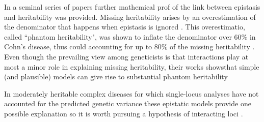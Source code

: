 In a seminal series of papers \cite{zuk2012mystery, zuk2014searching} further mathemical prof of the link between epistasis and heritability was provided.
Missing heritability arises by an overestimation of the denominator that happens when epistasis is ignored \cite{zuk2012mystery}.
This overestimatio, called ``phantom heritability", was shown to inflate the denominator over $60\%$ in Cohn's disease, thus could accounting for up to $80\%$ of the missing heritability \cite{zuk2012mystery}.
Even though the prevailing view among geneticists is that interactions play at most a minor role in explaining missing heritability, their works showsthat simple (and plausible) models can give rise to substantial phantom heritability \cite{zuk2012mystery}

In moderately heritable complex diseases for which single-locus analyses have not accounted for the predicted genetic variance these epistatic models provide one possible explanation so it is worth pursuing a hypothesis of interacting loci \cite{culverhouse2002perspective}.




